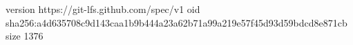 version https://git-lfs.github.com/spec/v1
oid sha256:a4d635708c9d143caa1b9b444a23a62b71a99a219e57f45d93d59bdcd8e871cb
size 1376
